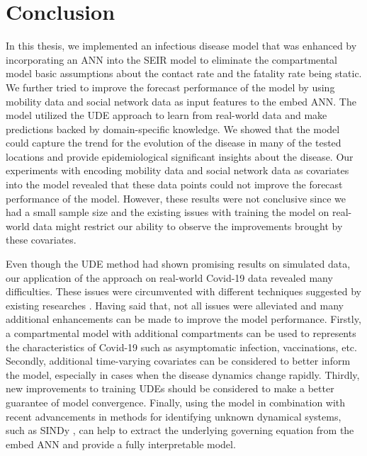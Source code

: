 \chapter{Conclusion}
\label{chap:conclusion}

In this thesis, we implemented an infectious disease model that was enhanced by incorporating an \gls{ANN} into the \gls{SEIR} model to eliminate the compartmental model basic assumptions about the contact rate and the fatality rate being static.
We further tried to improve the forecast performance of the model by using mobility data and social network data as input features to the embed \gls{ANN}.
The model utilized the \gls{UDE} approach \cite{rackauckasUniversalDifferentialEquations2020} to learn from real-world data and make predictions backed by domain-specific knowledge.
We showed that the model could capture the trend for the evolution of the disease in many of the tested locations and provide epidemiological significant insights about the disease.
Our experiments with encoding mobility data and social network data as covariates into the model revealed that these data points could not improve the forecast performance of the model.
However, these results were not conclusive since we had a small sample size and the existing issues with training the model on real-world data might restrict our ability to observe the improvements brought by these covariates.

Even though the \gls{UDE} method had shown promising results on simulated data, our application of the approach on real-world Covid-19 data revealed many difficulties.
These issues were circumvented with different techniques suggested by existing researches \cite{kimStiffNeuralOrdinary2021,rackauckasUniversalDifferentialEquations2020}.
Having said that, not all issues were alleviated and many additional enhancements can be made to improve the model performance.
Firstly, a compartmental model with additional compartments can be used to represents the characteristics of Covid-19 such as asymptomatic infection, vaccinations, etc.
Secondly, additional time-varying covariates can be considered to better inform the model, especially in cases when the disease dynamics change rapidly.
Thirdly, new improvements to training \glspl{UDE} should be considered to make a better guarantee of model convergence.
Finally, using the model in combination with recent advancements in methods for identifying unknown dynamical systems, such as \gls{SINDy} \cite{bruntonDiscoveringGoverningEquations2016}, can help to extract the underlying governing equation from the embed \gls{ANN} and provide a fully interpretable model.